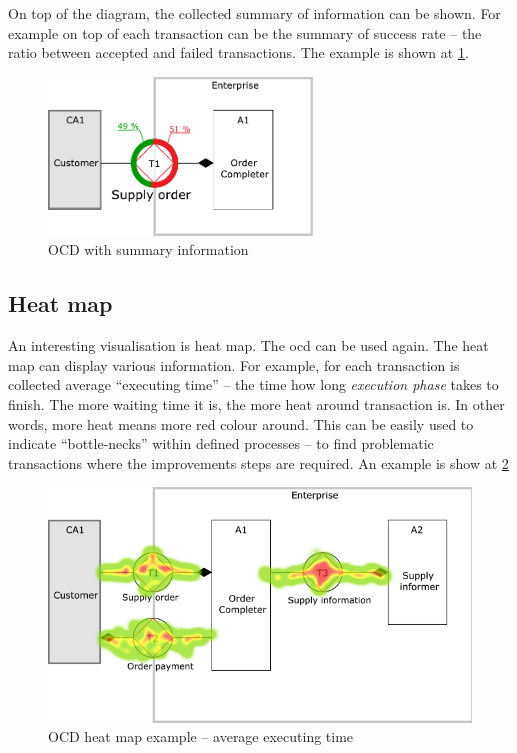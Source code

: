 On top of the diagram, the collected summary of information can be shown. For example on top of each transaction can be the summary of success rate -- the ratio between accepted and failed transactions. The example is shown at \cref{fig:ocd-sum}.

\begin{figure}[ht!]
\centering
\includegraphics[width=7cm,keepaspectratio]{img/ocd-sum}
\caption{OCD with summary information}
\label{fig:ocd-sum}
\end{figure}
\subsection{Heat map}
An interesting visualisation is heat map. The \gls{ocd} can be used again. The heat map can display various information. For example, for each transaction is collected average ``executing time'' -- the time how long  \textit{execution phase} takes to finish. The more waiting time it is, the more heat around transaction is. In other words, more heat means more red colour around. This can be easily used to indicate ``bottle-necks'' within defined processes -- to find problematic transactions where the improvements steps are required. An example is show at \cref{fig:ocd-heat-map}

\begin{figure}[ht!]
\centering
\includegraphics[width=12cm,keepaspectratio]{img/ocd-heat-map}
\caption{OCD heat map example -- average executing time}
\label{fig:ocd-heat-map}
\end{figure}
